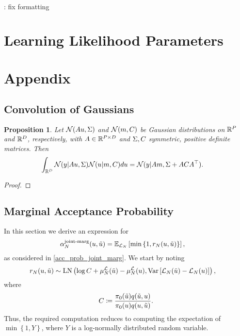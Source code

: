 \documentclass[12pt]{article}
\newtheorem{prop}{Proposition}
\begin{document}
\todo: fix formatting


\section{Learning Likelihood Parameters} \label{section_lik_par}

\section{Appendix}

\subsection{Convolution of Gaussians}

\begin{prop} \label{Gaussian_convolution}
Let $\Gaussian(A \Par, \likPar)$ and $\Gaussian(m, C)$ be Gaussian distributions on $\R^{\dimObs}$ and $\R^{\dimPar}$, 
respectively, with $A \in \R^{\dimObs \times \dimPar}$ and $\likPar, C$ symmetric, positive definite matrices. Then 
\begin{align*}
\int_{\R^{\dimPar}} \Gaussian(\obs | A \Par, \likPar) \Gaussian(\Par | m, C) d\Par
&= \Gaussian(\obs | Am, \likPar + ACA^\top). 
\end{align*}
\end{prop}

\begin{proof} 
\todo
\end{proof}


\subsection{Marginal Acceptance Probability}
In this section we derive an expression for 
\begin{align}
\llikEmJointMarg[\Ndesign]{\accProbMH}(\Par, \propPar) 
&= \E_{\llikEm[\Ndesign]} \left[\min\left\{1, \Em[\Ndesign]{\accProbRatio}(\Par, \propPar)\right\} \right], 
\end{align}
as considered in \ref{acc_prob_joint_marg}. We start by noting 
\begin{align}
\Em[\Ndesign]{\accProbRatio}(\Par, \propPar)
&\sim \LN\left(\log C + \emMean[\Ndesign]{\llik}(\propPar) - \emMean[\Ndesign]{\llik}(\Par), \Var\left[\llikEm[\Ndesign](\propPar) - \llikEm[\Ndesign](\Par) \right] \right),
\label{acc_ratio_LN}
\end{align}
where 
\begin{align*}
C \Def \frac{\priorDens(\propPar) \propDens(\propPar, \Par)}{\priorDens(\Par) \propDens(\Par, \propPar)}.
\end{align*}
Thus, the required computation reduces to computing the expectation of $\min\left\{1, Y \right\}$, where $Y$ is a log-normally distributed 
random variable. 
\end{document}
